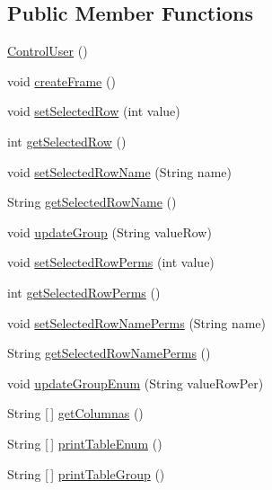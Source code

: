 \subsection*{Public Member Functions}
\begin{DoxyCompactItemize}
\item 
\hyperlink{classcom_1_1eneri_1_1scorpio__metertool_1_1ui_1_1_control_user_a806b2cd8dcc83e0c9ae205e8298b340c}{Control\+User} ()
\item 
void \hyperlink{classcom_1_1eneri_1_1scorpio__metertool_1_1ui_1_1_control_user_a577311d378b49e2d4627f464affe4c18}{create\+Frame} ()
\item 
void \hyperlink{classcom_1_1eneri_1_1scorpio__metertool_1_1ui_1_1_control_user_a7e8e58de5a86e259f953026a7b6f7bee}{set\+Selected\+Row} (int value)
\item 
int \hyperlink{classcom_1_1eneri_1_1scorpio__metertool_1_1ui_1_1_control_user_a51b7ad0d6c4309e35622f30e23f9a1c7}{get\+Selected\+Row} ()
\item 
void \hyperlink{classcom_1_1eneri_1_1scorpio__metertool_1_1ui_1_1_control_user_a75204991d1b88435baa65c8deb6ddda7}{set\+Selected\+Row\+Name} (String name)
\item 
String \hyperlink{classcom_1_1eneri_1_1scorpio__metertool_1_1ui_1_1_control_user_a4bfba219f47b40166c4bcff1aef0aa3d}{get\+Selected\+Row\+Name} ()
\item 
void \hyperlink{classcom_1_1eneri_1_1scorpio__metertool_1_1ui_1_1_control_user_a67d5157d89f9a90aa5d41b6f8bf5ec33}{update\+Group} (String value\+Row)
\item 
void \hyperlink{classcom_1_1eneri_1_1scorpio__metertool_1_1ui_1_1_control_user_aa7eaf534d3ad8bc7f3126917420353c7}{set\+Selected\+Row\+Perms} (int value)
\item 
int \hyperlink{classcom_1_1eneri_1_1scorpio__metertool_1_1ui_1_1_control_user_a836965a6a9c247d3280da518c0aede66}{get\+Selected\+Row\+Perms} ()
\item 
void \hyperlink{classcom_1_1eneri_1_1scorpio__metertool_1_1ui_1_1_control_user_a597be8ffe27840a781917c291fa4edc8}{set\+Selected\+Row\+Name\+Perms} (String name)
\item 
String \hyperlink{classcom_1_1eneri_1_1scorpio__metertool_1_1ui_1_1_control_user_a1093c6bd289267aaea4d4e67a2a9e8b4}{get\+Selected\+Row\+Name\+Perms} ()
\item 
void \hyperlink{classcom_1_1eneri_1_1scorpio__metertool_1_1ui_1_1_control_user_a2bc4d7b6ed62e8fec2fa6bbd14b8f334}{update\+Group\+Enum} (String value\+Row\+Per)
\item 
String \mbox{[}$\,$\mbox{]} \hyperlink{classcom_1_1eneri_1_1scorpio__metertool_1_1ui_1_1_control_user_a58493dcc27654c8a9166696ee9a3ce21}{get\+Columnas} ()
\item 
String \mbox{[}$\,$\mbox{]} \hyperlink{classcom_1_1eneri_1_1scorpio__metertool_1_1ui_1_1_control_user_a863b4f7c19bac3bd97b596470c9a3b2e}{print\+Table\+Enum} ()
\item 
String \mbox{[}$\,$\mbox{]} \hyperlink{classcom_1_1eneri_1_1scorpio__metertool_1_1ui_1_1_control_user_aa4c9c43a3731a1e24b3bed712fe7a891}{print\+Table\+Group} ()
\end{DoxyCompactItemize}


